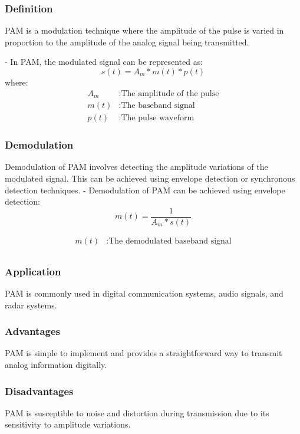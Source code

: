 \documentclass{IEEEtran}
\begin{document}
	\subsubsection{Definition}
	 PAM is a modulation technique where the amplitude of the pulse is varied in proportion to the amplitude of the analog signal being transmitted.
	 
	 - In PAM, the modulated signal can be represented as:
	 \begin{equation}
		s(t) = A_m * m(t) * p(t)
	 \end{equation}
	 where:
	 \begin{align*}
	 	 A_m  & : \text{The amplitude of the pulse} \\
	 	 m(t) & : \text{The baseband signal} \\
	 	 p(t) & : \text{The pulse waveform}
	 \end{align*}
	 
	\subsubsection{Demodulation}
	 Demodulation of PAM involves detecting the amplitude variations of the modulated signal. This can be achieved using envelope detection or synchronous detection techniques.
	 - Demodulation of PAM can be achieved using envelope detection:
	  \begin{equation}
	 	m(t) = \frac{ 1}{A_m * s(t)}
	 \end{equation}
	 
	 \begin{align*}
	 	m(t)  & : \text{The demodulated baseband signal} \\
	 \end{align*}
	  
	\subsubsection{Application}
	PAM is commonly used in digital communication systems, audio signals, and radar systems.
	
	\subsubsection{Advantages}
	PAM is simple to implement and provides a straightforward way to transmit analog information digitally.
	
	\subsubsection{Disadvantages}
	 PAM is susceptible to noise and distortion during transmission due to its sensitivity to amplitude variations.
	
\end{document}
